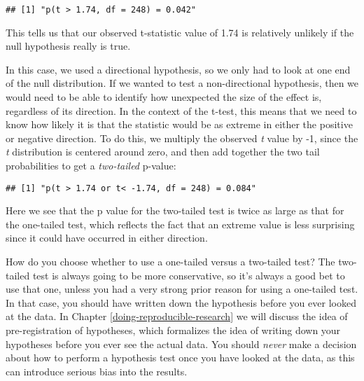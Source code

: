 \documentclass[]{book}
\newenvironment{Shaded}{\begin{snugshade}}{\end{snugshade}}
\newcommand{\KeywordTok}[1]{\textcolor[rgb]{0.13,0.29,0.53}{\textbf{#1}}}
\newcommand{\DataTypeTok}[1]{\textcolor[rgb]{0.13,0.29,0.53}{#1}}
\newcommand{\DecValTok}[1]{\textcolor[rgb]{0.00,0.00,0.81}{#1}}
\newcommand{\StringTok}[1]{\textcolor[rgb]{0.31,0.60,0.02}{#1}}
\newcommand{\OtherTok}[1]{\textcolor[rgb]{0.56,0.35,0.01}{#1}}
\newcommand{\OperatorTok}[1]{\textcolor[rgb]{0.81,0.36,0.00}{\textbf{#1}}}
\newcommand{\NormalTok}[1]{#1}
\theoremstyle{definition}
\theoremstyle{definition}
\theoremstyle{definition}
\theoremstyle{remark}
\begin{document}
\begin{verbatim}
## [1] "p(t > 1.74, df = 248) = 0.042"
\end{verbatim}

This tells us that our observed t-statistic value of 1.74 is relatively
unlikely if the null hypothesis really is true.

In this case, we used a directional hypothesis, so we only had to look
at one end of the null distribution. If we wanted to test a
non-directional hypothesis, then we would need to be able to identify
how unexpected the size of the effect is, regardless of its direction.
In the context of the t-test, this means that we need to know how likely
it is that the statistic would be as extreme in either the positive or
negative direction. To do this, we multiply the observed \emph{t} value
by -1, since the \emph{t} distribution is centered around zero, and then
add together the two tail probabilities to get a \emph{two-tailed}
p-value:

\begin{Shaded}
\end{Shaded}

\begin{verbatim}
## [1] "p(t > 1.74 or t< -1.74, df = 248) = 0.084"
\end{verbatim}

Here we see that the p value for the two-tailed test is twice as large
as that for the one-tailed test, which reflects the fact that an extreme
value is less surprising since it could have occurred in either
direction.

How do you choose whether to use a one-tailed versus a two-tailed test?
The two-tailed test is always going to be more conservative, so it's
always a good bet to use that one, unless you had a very strong prior
reason for using a one-tailed test. In that case, you should have
written down the hypothesis before you ever looked at the data. In
Chapter \ref{doing-reproducible-research} we will discuss the idea of
pre-registration of hypotheses, which formalizes the idea of writing
down your hypotheses before you ever see the actual data. You should
\emph{never} make a decision about how to perform a hypothesis test once
you have looked at the data, as this can introduce serious bias into the
results.
\end{document}

